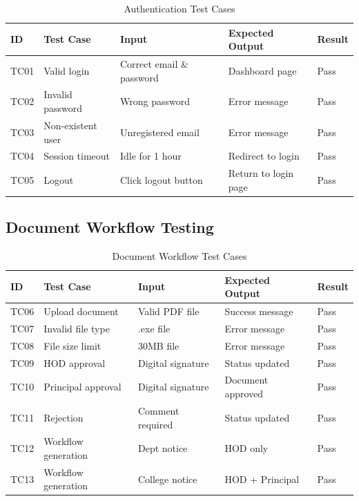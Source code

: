 \begin{table}[H]
\centering
\small
\begin{tabular}{|p{1cm}|p{4cm}|p{3cm}|p{3cm}|p{2cm}|}
\hline
\textbf{ID} & \textbf{Test Case} & \textbf{Input} & \textbf{Expected Output} & \textbf{Result} \\
\hline
TC01 & Valid login & Correct email \& password & Dashboard page & Pass \\
\hline
TC02 & Invalid password & Wrong password & Error message & Pass \\
\hline
TC03 & Non-existent user & Unregistered email & Error message & Pass \\
\hline
TC04 & Session timeout & Idle for 1 hour & Redirect to login & Pass \\
\hline
TC05 & Logout & Click logout button & Return to login page & Pass \\
\hline
\end{tabular}
\caption{Authentication Test Cases}
\end{table}

\subsection{Document Workflow Testing}

\begin{table}[H]
\centering
\small
\begin{tabular}{|p{1cm}|p{4cm}|p{3cm}|p{3cm}|p{2cm}|}
\hline
\textbf{ID} & \textbf{Test Case} & \textbf{Input} & \textbf{Expected Output} & \textbf{Result} \\
\hline
TC06 & Upload document & Valid PDF file & Success message & Pass \\
\hline
TC07 & Invalid file type & .exe file & Error message & Pass \\
\hline
TC08 & File size limit & 30MB file & Error message & Pass \\
\hline
TC09 & HOD approval & Digital signature & Status updated & Pass \\
\hline
TC10 & Principal approval & Digital signature & Document approved & Pass \\
\hline
TC11 & Rejection & Comment required & Status updated & Pass \\
\hline
TC12 & Workflow generation & Dept notice & HOD only & Pass \\
\hline
TC13 & Workflow generation & College notice & HOD + Principal & Pass \\
\hline
\end{tabular}
\caption{Document Workflow Test Cases}
\end{table}

